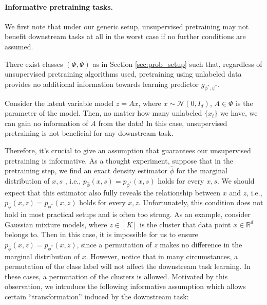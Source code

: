 \paragraph{Informative pretraining tasks.}
We first note that under our generic setup, unsupervised pretraining may not benefit downstream tasks at all in the worst case if no further conditions are assumed.
\begin{proposition} \label{prop:informative_necessary}
There exist classes $(\Phi, \Psi)$ as in Section \ref{sec:prob_setup} such that, regardless of unsupervised pretraining algorithms used, pretraining using unlabeled data provides no additional information towards learning predictor $g_{\phi^* , \psi^* }$.
\end{proposition}
Consider the latent variable model $z=Ax$, where $x \sim \mathcal{N}(0,I_{d})$, $A\in \Phi$ is the parameter of the model. Then, no matter how many unlabeled $\{x_{i}\}$ we have, we can gain no information of $A$ from the data! In this case, unsupervised pretraining is not beneficial for any downstream task. 

Therefore, it's crucial to give an assumption that guarantees our unsupervised pretraining is informative. As a thought experiment, suppose that in the pretraining step, we find an exact density estimator $\hat{\phi}$ for the marginal distribution of $x,s$ , i.e., $p_{\hat{\phi}}(x,s)=p_{\phi^{*}}(x,s)$ holds for every $x,s$. We should expect that this estimator also fully reveals the relationship between $x$ and $z$, i.e., $p_{\hat{\phi}}(x,z)=p_{\phi^{*}}(x,z)$ holds for every $x,z$. Unfortunately, this condition does not hold in most practical setups and is often too strong. As an example, consider Gaussian mixture models, where $z \in [K]$ is the cluster that data point $x \in \mathbb{R}^{d}$ belongs to. Then in this case, it is impossible for us to ensure $p_{\hat{\phi}}(x,z)=p_{\phi^{*}}(x,z)$, since a permutation of $z$ makes no difference in the marginal distribution of $x$. However, notice that in many circumstances, a permutation of the class label will not affect the downstream task learning. In these cases, a permutation of the clusters is allowed. Motivated by this observation, we introduce the following informative assumption which allows certain ``transformation'' induced by the downstream task:

